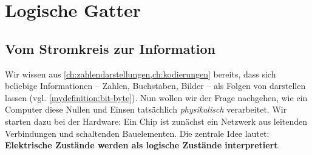 \chapter{Logische Gatter}\label{ch:logische_gatter}

\section{Vom Stromkreis zur Information}

Wir wissen aus \cref{ch:zahlendarstellungen,ch:kodierungen} bereits, dass sich beliebige Informationen -- Zahlen, Buchstaben, Bilder -- als Folgen von  darstellen lassen (vgl. \cref{mydefinition:bit-byte}). Nun wollen wir der Frage nachgehen, wie ein Computer diese Nullen und Einsen tatsächlich \emph{physikalisch} verarbeitet. Wir starten dazu bei der Hardware: Ein Chip ist zunächst ein Netzwerk aus leitenden Verbindungen und schaltenden Bauelementen. Die zentrale Idee lautet: \textbf{Elektrische Zustände werden als logische Zustände interpretiert}.


